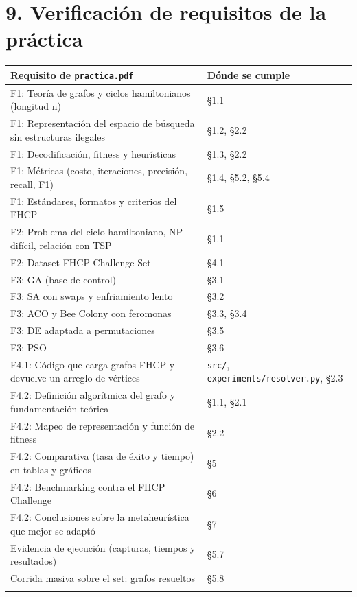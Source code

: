 \documentclass[
  spanish,
  11pt,
]{article}
\newcounter{none} %
\begin{document}
\section{9. Verificación de requisitos de la
práctica}\label{verificaciuxf3n-de-requisitos-de-la-pruxe1ctica}

{\def\LTcaptype{none} %
\begin{center}
\begin{tabular}{@{}
  >{\raggedright\arraybackslash}p{}
  >{\raggedright\arraybackslash}p{}@{}}
\toprule\noalign{}
\begin{minipage}[b]{\linewidth}\raggedright
Requisito de \texttt{practica.pdf}
\end{minipage} & \begin{minipage}[b]{\linewidth}\raggedright
Dónde se cumple
\end{minipage} \\
\midrule\noalign{}
F1: Teoría de grafos y ciclos hamiltonianos (longitud n) & §1.1 \\
F1: Representación del espacio de búsqueda sin estructuras ilegales &
§1.2, §2.2 \\
F1: Decodificación, fitness y heurísticas & §1.3, §2.2 \\
F1: Métricas (costo, iteraciones, precisión, recall, F1) & §1.4, §5.2,
§5.4 \\
F1: Estándares, formatos y criterios del FHCP & §1.5 \\
F2: Problema del ciclo hamiltoniano, NP-difícil, relación con TSP &
§1.1 \\
F2: Dataset FHCP Challenge Set & §4.1 \\
F3: GA (base de control) & §3.1 \\
F3: SA con swaps y enfriamiento lento & §3.2 \\
F3: ACO y Bee Colony con feromonas & §3.3, §3.4 \\
F3: DE adaptada a permutaciones & §3.5 \\
F3: PSO & §3.6 \\
F4.1: Código que carga grafos FHCP y devuelve un arreglo de vértices &
\texttt{src/}, \texttt{experiments/resolver.py}, §2.3 \\
F4.2: Definición algorítmica del grafo y fundamentación teórica & §1.1,
§2.1 \\
F4.2: Mapeo de representación y función de fitness & §2.2 \\
F4.2: Comparativa (tasa de éxito y tiempo) en tablas y gráficos & §5 \\
F4.2: Benchmarking contra el FHCP Challenge & §6 \\
F4.2: Conclusiones sobre la metaheurística que mejor se adaptó & §7 \\
Evidencia de ejecución (capturas, tiempos y resultados) & §5.7 \\
Corrida masiva sobre el set: grafos resueltos & §5.8 \\
\bottomrule\noalign{}
\end{tabular}
\end{center}
}
\end{document}
